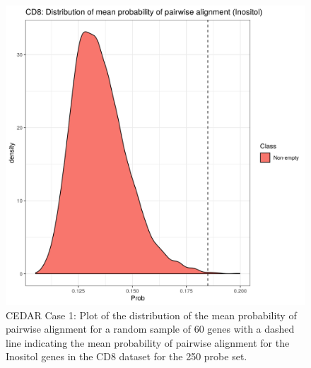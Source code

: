 \documentclass[12pt]{article} %
\begin{document}
	\begin{figure}[h]
		\centering
		\includegraphics[scale=0.75]{Images/Biology_data/Set_250/All_datasets/Mean_alignment_probability/CD8_KEGG_INOSITOL_PHOSPHATE_METABOLISM.png}
		\caption{CEDAR Case 1: Plot of the distribution of the mean probability of pairwise alignment for a random sample of 60 genes with a dashed line indicating the mean probability of pairwise alignment for the Inositol genes in the CD8 dataset for the 250 probe set.}
		\label{fig:results:cedar_1:mdi_cd8_inostiol_alignemnt_prob_distn}
	\end{figure}
\end{document}
